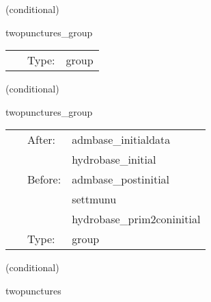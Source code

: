    (conditional) 

\hspace{5mm} twopunctures\_group 

\hspace{5mm}{\it twopunctures initial data group } 


\hspace{5mm}

 \begin{tabular*}{160mm}{cll} 
~ & Type:  & group \\ 
\end{tabular*} 


\vspace{5mm}

   (conditional) 

\hspace{5mm} twopunctures\_group 

\hspace{5mm}{\it twopunctures initial data group } 


\hspace{5mm}

 \begin{tabular*}{160mm}{cll} 
~ & After:  & admbase\_initialdata \\ 
~& ~ &hydrobase\_initial\\ 
~ & Before:  & admbase\_postinitial \\ 
~& ~ &settmunu\\ 
~& ~ &hydrobase\_prim2coninitial\\ 
~ & Type:  & group \\ 
\end{tabular*} 


\vspace{5mm}

   (conditional) 

\hspace{5mm} twopunctures 

\hspace{5mm}{\it create puncture black hole initial data } 


\hspace{5mm}

